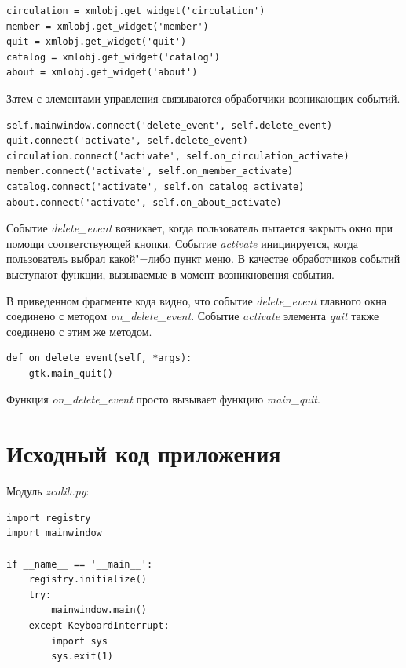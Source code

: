\documentclass[a4paper,openany,twoside,draft]{book}
\providecommand*{\DUroletitlereference}[1]{\textsl{#1}}
\begin{document}
\begin{verbatim}
circulation = xmlobj.get_widget('circulation')
member = xmlobj.get_widget('member')
quit = xmlobj.get_widget('quit')
catalog = xmlobj.get_widget('catalog')
about = xmlobj.get_widget('about')
\end{verbatim}

Затем с элементами управления связываются обработчики возникающих событий.

\begin{verbatim}
self.mainwindow.connect('delete_event', self.delete_event)
quit.connect('activate', self.delete_event)
circulation.connect('activate', self.on_circulation_activate)
member.connect('activate', self.on_member_activate)
catalog.connect('activate', self.on_catalog_activate)
about.connect('activate', self.on_about_activate)
\end{verbatim}

Событие \DUroletitlereference{delete\_event} возникает, когда пользователь пытается закрыть окно при помощи соответствующей кнопки.  Событие \DUroletitlereference{activate} инициируется, когда пользователь выбрал какой"=либо пункт меню.  В качестве обработчиков событий выступают функции, вызываемые в момент возникновения события.

В приведенном фрагменте кода видно, что событие \DUroletitlereference{delete\_event} главного окна соединено с методом \DUroletitlereference{on\_delete\_event}.  Событие \DUroletitlereference{activate} элемента \DUroletitlereference{quit} также соединено с этим же методом.

\begin{verbatim}
def on_delete_event(self, *args):
    gtk.main_quit()
\end{verbatim}

Функция \DUroletitlereference{on\_delete\_event} просто вызывает функцию \DUroletitlereference{main\_quit}.


\section{Исходный код приложения%
  \label{id52}%
}

Модуль \DUroletitlereference{zcalib.py}:

\begin{verbatim}
import registry
import mainwindow

if __name__ == '__main__':
    registry.initialize()
    try:
        mainwindow.main()
    except KeyboardInterrupt:
        import sys
        sys.exit(1)
\end{verbatim}
\end{document}
